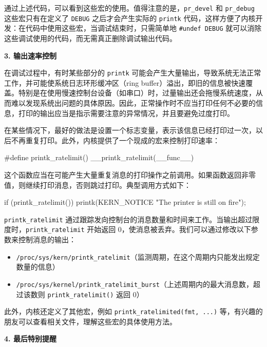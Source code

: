 通过上述代码，可以看到这些宏的使用。值得注意的是，\texttt{pr\_devel} 和 \texttt{pr\_debug} 这些宏只有在定义了 \texttt{DEBUG} 之后才会产生实际的 \texttt{printk} 代码，这样方便了内核开发：在代码中使用这些宏，当调试结束时，只需简单地 \texttt{\#undef\ DEBUG} 就可以消除这些调试使用的代码，而无需真正删除调试输出代码。

\textbf{3. 输出速率控制}

在调试过程中，有时某些部分的 \texttt{printk} 可能会产生大量输出，导致系统无法正常工作，并可能使系统日志环形缓冲区（ring buffer）溢出，即旧的信息被快速覆盖。特别是在使用慢速控制台设备（如串口）时，过量输出还会拖慢系统速度，从而难以发现系统出问题的具体原因。因此，正常操作时不应当打印任何不必要的信息，打印的输出应当是指示需要注意的异常情况，并且要避免过度打印。

在某些情况下，最好的做法是设置一个标志变量，表示该信息已经打印过一次，以后不再重复打印。此外，内核提供了一个现成的宏来控制打印速率：

\begin{CodeBlock}[language=BookC]
#define printk_ratelimit() __printk_ratelimit(__func__)
\end{CodeBlock}

这个函数应当在可能产生大量重复消息的打印操作之前调用。如果函数返回非零值，则继续打印消息，否则跳过打印。典型调用方式如下：

\begin{CodeBlock}[language=BookC]
if (printk_ratelimit())
    printk(KERN_NOTICE "The printer is still on fire\n");
\end{CodeBlock}

\texttt{printk\_ratelimit} 通过跟踪发向控制台的消息数量和时间来工作。当输出超过限度时，\texttt{printk\_ratelimit} 开始返回 0，使消息被丢弃。我们可以通过修改以下参数来控制消息的输出：

\begin{itemize}
\tightlist
\item
  \texttt{/proc/sys/kern/printk\_ratelimit}（监测周期，在这个周期内只能发出规定数量的信息）
\item
  \texttt{/proc/sys/kernel/printk\_ratelimit\_burst}（上述周期内的最大消息数，超过该数则 \texttt{printk\_ratelimit()} 返回 0）
\end{itemize}

此外，内核还定义了其他宏，例如 \texttt{printk\_ratelimited(fmt,\ ...)} 等，有兴趣的朋友可以查看相关文件，理解这些宏的具体使用方法。

\textbf{4. 最后特别提醒}


